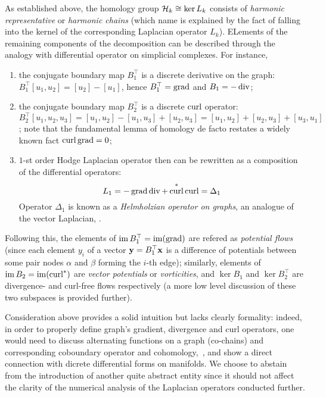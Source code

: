 As established above, the homology group \( \mathcal{H}_k \cong \ker L_k \) consists of \emph{harmonic representative} or \emph{harmonic chains} (which name is explained by the fact of falling into the kernel of the corresponding Laplacian operator \( L_k \)). ELements of the remaining components of the decomposition can be described through the analogy with differential operator on simplicial complexes. For instance, 
\begin{enumerate}
      \item the conjugate boundary map \( B_1^\top \) is a discrete derivative on the graph: \( B_1^\top  [u_1, u_2 ] = [ u_2 ] - [u_1]\), hence \( B_1^\top  = \operatorname*{\mathrm{grad}} \) and \( B_1 =  -\operatorname*{\mathrm{div}} \);
      \item the conjugate boundary map \( B_2^\top \) is a discrete \( \operatorname*{\mathrm{curl}} \) operator: \( B_2^\top [u_1, u_2, u_3 ] = [u_1, u_2] - [u_1, u_3]+[u_2, u_3] = [u_1, u_2] +[u_2, u_3] + [u_3, u_1]\); note that the fundamental lemma of homology de facto restates a widely known fact \( \operatorname*{\mathrm{curl}} \operatorname*{\mathrm{grad}} = 0 \);
      \item \(1\)-st order Hodge Laplacian operator then can be rewritten as a composition of the differential operators:
      \begin{equation}
            L_1 = - \operatorname*{\mathrm{grad}} \operatorname*{\mathrm{div}} + \operatorname*{\mathrm{curl}}^* \operatorname*{\mathrm{curl}} = \Delta_1
      \end{equation}
      Operator \( \Delta_1 \) is known as a \emph{Helmholzian operator on graphs}, an analogue of the vector Laplacian, \cite{hanlonLaplacianMethod2002}.
\end{enumerate}

Following this, the elements of \( \operatorname{im} B_1^\top = \operatorname{im} ( \operatorname*{\mathrm{grad}} )\) are refered as \emph{potential flows} (since each element \( y_i\) of a vector \( \mathbf{y} = B_1^\top \mathbf{x} \) is a difference of potentials between some pair nodes \( \alpha \) and \( \beta \) forming the \(i\)-th edge); similarly, elements of \( \operatorname{im} B_2 = \operatorname{im}( \operatorname*{\mathrm{curl}}^*)\) are \emph{vector potentials} or \emph{vorticities}, and \( \ker B_1 \) and \( \ker B_2^\top \) are divergence- and curl-free flows respectively (a more low level discussion of these two subspaces is provided further).

\begin{remark}
      Consideration above provides a solid intuition but lacks clearly formality: indeed, in order to properly define graph's gradient, divergence and curl operators, one would need to discuss alternating functions on a graph (co-chains) and corresponding coboundary operator and cohomology,~\cite{limHodgeLaplaciansGraphs2020}, and show a direct connection with dicrete differential forms on manifolds. We choose to abstain from the introduction of another quite abstract entity since it should not affect the clarity of the numerical analysis of the Laplacian operators conducted further.
\end{remark}







